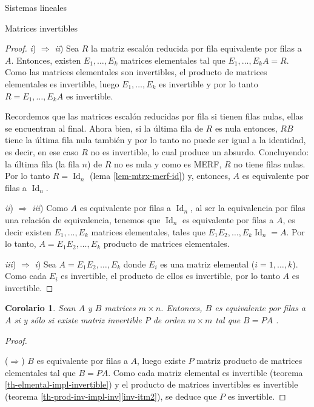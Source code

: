 \documentclass[a4paper,12pt,twoside,spanish,reqno]{amsbook}
\numberwithin{equation}{section}
\newtheorem{corolario}[teorema]{Corolario}
\theoremstyle{definition}
\theoremstyle{remark}
\newcommand{\Id}{\operatorname{Id}}
\begin{document}
\begin{chapter}{Sistemas lineales}
\begin{section}{Matrices invertibles}
\begin{proof}
                
                \textit{i}) $\Rightarrow$ \textit{ii})\; Sea $R$ la matriz escalón reducida por fila equivalente por filas a $A$. Entonces,  existen $E_1,\ldots,E_k$ matrices elementales tal que $E_1,\ldots,E_kA = R$. Como las matrices elementales son invertibles, el producto de matrices elementales es invertible, luego  $E_1,\ldots,E_k$ es invertible y por lo tanto $R=E_1,\ldots,E_kA$ es invertible. 
                
                Recordemos que las matrices escalón reducidas por fila si tienen filas nulas, ellas se encuentran al final.  Ahora bien,  si la última fila de $R$ es nula entonces,  $RB$ tiene la última fila nula también y por lo tanto no puede ser igual a la identidad, es decir, en ese caso $R$ no es invertible, lo cual produce un absurdo. Concluyendo: la última fila (la fila $n$) de $R$ no es nula y como es MERF, $R$ no tiene filas nulas. Por lo tanto $R=\Id_n$ (lema \ref{lem-mtrx-merf-id}) y,  entonces, $A$ es equivalente por filas a $\Id_n$. 
                
                \textit{ii}) $\Rightarrow$ \textit{iii})\; Como $A$  es equivalente por filas a $\Id_n$, al ser la equivalencia por filas una relación de equivalencia,  tenemos que $\Id_n$ es equivalente por filas a $A$, es decir  existen $E_1,\ldots,E_k$ matrices elementales, tales que $E_1E_2,\ldots,E_k\Id_n = A$. Por lo tanto, $A =E_1E_2,\ldots,E_k$ producto de matrices elementales.
                
                \textit{iii}) $\Rightarrow$ \textit{i}) \; Sea $A = E_1E_2,\ldots,E_k$ donde $E_i$  es una matriz elemental ($i=1,\ldots,k$). Como cada $E_i$ es invertible,  el producto de ellos es invertible,  por lo tanto $A$ es invertible.
            \end{proof}	
            
            \begin{corolario}
                Sean $A$ y $B$ matrices $m \times n$. Entonces,   $B$ es equivalente por filas a $A$ si y sólo si existe matriz invertible $P$ de orden $m \times m$ tal que $B =PA$ . 
            \end{corolario}
            \begin{proof}
                
                \
                
                ($\Rightarrow$) $B$ es equivalente por filas a $A$,  luego existe $P$ matriz producto de matrices elementales tal que $B =PA$. Como cada matriz elemental es invertible (teorema \ref{th-elmental-impl-invertible}) y el producto de matrices invertibles es invertible (teorema  \ref{th-prod-inv-impl-inv}\ref{inv-itm2}), se deduce que $P$ es invertible. 
                

\end{proof}
\end{section}
\end{chapter}
\end{document}
